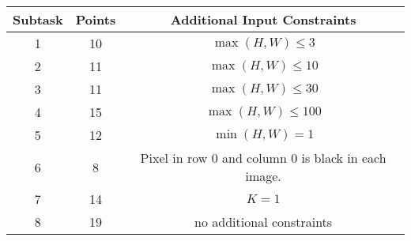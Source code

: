 \begin{center}
\renewcommand{\arraystretch}{1.5}
\begin{tabular}{|c|c|c|}
\hline
Subtask & Points & Additional Input Constraints\\
\hline
1 & 10 & $\max(H, W) \leq 3$ \\
\hline
2 & 11 & $\max(H, W) \leq 10$ \\
\hline
3 & 11 & $\max(H, W) \leq 30$ \\
\hline
4 & 15 & $\max(H, W) \leq 100$\\
\hline
5 & 12 & $\min(H, W)=1$ \\
\hline
6 & 8 & Pixel in row $0$ and column $0$ is black in each image. \\
\hline
7 & 14 & $K=1$ \\
\hline
8 & 19 & no additional constraints \\
\hline
\end{tabular}
\end{center}